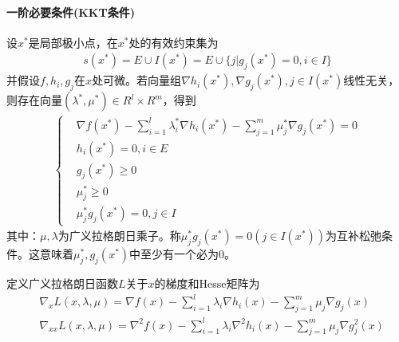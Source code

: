         \paragraph{一阶必要条件(KKT条件)}
        设$x^*$是局部极小点，在$x^*$处的有效约束集为
        \begin{align*}
        s(x^*)=E\cup I(x^*)=E\cup\{j|g_j(x^*)=0,i\in I\}
        \end{align*}
        并假设$f,h_i,g_j$在$x$处可微。若向量组$\nabla h_i(x^*),\nabla g_j(x^*),j \in I(x^*)$线性无关，则存在向量$({\lambda}^*,{\mu}^*) \in R^l\times R^m$，得到
        \begin{align*}
        \left \{
        \begin{aligned}
        & \nabla f(x^*)-\mathop {\sum}\limits_{i=1}^l {\lambda}^*_i{\nabla}{h_i}(x^*)-\mathop {\sum}\limits_{j=1}^m {\mu}^*_j{\nabla}{g_j}(x^*)=0\\
        & h_i(x^*)=0,i \in E\\
        & g_j(x^*) \geqslant 0\\
        & {\mu}^*_j \geqslant 0\\
        & {\mu}^*_j g_j(x^*)=0,j \in I
        \end{aligned}
        \right.
        \end{align*}
        其中：$\mu ,\lambda$为广义拉格朗日乘子。称${\mu}_j^*g_j(x^*)=0(j \in I(x^*))$为互补松弛条件。这意味着${\mu}_j^*,g_j(x^*)$中至少有一个必为0。
        \par
        定义广义拉格朗日函数$L$关于$x$的梯度和Hesse矩阵为
        \begin{align*}
        & {\nabla}_{x}L(x,\lambda,\mu)={\nabla}f(x)-\mathop {\sum}\limits_{i=1}^l{\lambda}_i {\nabla} h_i(x)-\mathop {\sum}\limits_{j=1}^m{\mu}_j {\nabla} g_j(x)\\
        & {\nabla}_{xx}L(x,\lambda,\mu)={\nabla}^2f(x)-\mathop {\sum}\limits_{i=1}^l{\lambda}_i {\nabla}^2 h_i(x)-\mathop {\sum}\limits_{j=1}^m{\mu}_j {\nabla} g_j^2(x)
        \end{align*}
